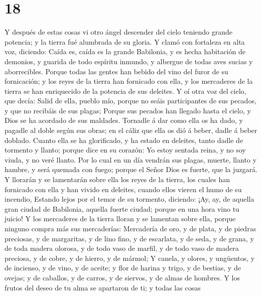 \hypertarget{section-17}{%
\section{18}\label{section-17}}

 Y después de estas cosas vi otro ángel descender del
cielo teniendo grande potencia; y la tierra fué alumbrada de su gloria.
 Y clamó con fortaleza en alta voz, diciendo: Caída es,
caída es la grande Babilonia, y es hecha habitación de demonios, y
guarida de todo espíritu inmundo, y albergue de todas aves sucias y
aborrecibles.  Porque todas las gentes han bebido del vino
del furor de su fornicación; y los reyes de la tierra han fornicado con
ella, y los mercaderes de la tierra se han enriquecido de la potencia de
sus deleites.  Y oí otra voz del cielo, que decía: Salid
de ella, pueblo mío, porque no seáis participantes de sus pecados, y que
no recibáis de sus plagas;  Porque sus pecados han llegado
hasta el cielo, y Dios se ha acordado de sus maldades. 
Tornadle á dar como ella os ha dado, y pagadle al doble según sus obras;
en el cáliz que ella os dió á beber, dadle á beber doblado.
 Cuanto ella se ha glorificado, y ha estado en deleites,
tanto dadle de tormento y llanto; porque dice en su corazón: Yo estoy
sentada reina, y no soy viuda, y no veré llanto.  Por lo
cual en un día vendrán sus plagas, muerte, llanto y hambre, y será
quemada con fuego; porque el Señor Dios es fuerte, que la juzgará.
 Y llorarán y se lamentarán sobre ella los reyes de la
tierra, los cuales han fornicado con ella y han vivido en deleites,
cuando ellos vieren el humo de su incendio,  Estando
lejos por el temor de su tormento, diciendo: ¡Ay, ay, de aquella gran
ciudad de Babilonia, aquella fuerte ciudad; porque en una hora vino tu
juicio!  Y los mercaderes de la tierra lloran y se
lamentan sobre ella, porque ninguno compra más sus mercaderías:
 Mercadería de oro, y de plata, y de piedras preciosas, y
de margaritas, y de lino fino, y de escarlata, y de seda, y de grana, y
de toda madera olorosa, y de todo vaso de marfil, y de todo vaso de
madera preciosa, y de cobre, y de hierro, y de mármol;  Y
canela, y olores, y ungüentos, y de incienso, y de vino, y de aceite; y
flor de harina y trigo, y de bestias, y de ovejas; y de caballos, y de
carros, y de siervos, y de almas de hombres.  Y los
frutos del deseo de tu alma se apartaron de ti; y todas las cosas
